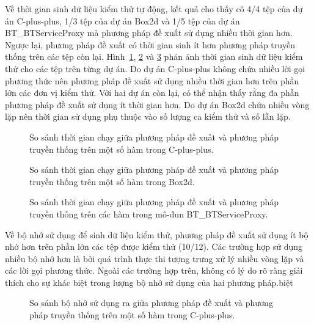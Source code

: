 Về thời gian sinh dữ liệu kiểm thử tự động, kết quả cho thấy có 4/4 tệp của dự án C-plus-plus, 1/3 tệp của dự án Box2d và 1/5 tệp của dự án BT\_BTServiceProxy mà phương pháp đề xuất sử dụng nhiều thời gian hơn. Ngược lại, phương pháp đề xuất có thời gian sinh ít hơn phương pháp truyền thống trên các tệp còn lại. Hình~\ref{fig:time-algo}, \ref{fig:time-box2d} và \ref{fig:time-serviceproxy} phản ánh thời gian sinh dữ liệu kiểm thử cho các tệp trên từng dự án. Do dự án C-plus-plus không chứa nhiều lời gọi phương thức nên phương pháp đề xuất sử dụng nhiều thời gian hơn trên phần lớn các đơn vị kiểm thử. Với hai dự án còn lại, có thể nhận thấy rằng đa phần phương pháp đề xuất sử dụng ít thời gian hơn. Do dự án Box2d chứa nhiều vòng lặp nên thời gian sử dụng phụ thuộc vào số lượng ca kiểm thử và số lần lặp.

\begin{figure}[H]
    \centering
    
    \caption{So sánh thời gian chạy giữa phương pháp đề xuất và phương pháp truyền thống trên một số hàm trong C-plus-plus.}
    \label{fig:time-algo}
\end{figure}

\begin{figure}[H]
	\centering
	
	\caption{So sánh thời gian chạy giữa phương pháp đề xuất và phương pháp truyền thống trên một số hàm trong Box2d.}
	\label{fig:time-box2d}
\end{figure}

\begin{figure}[H]
	\centering
	
	\caption{So sánh thời gian chạy giữa phương pháp đề xuất và phương pháp truyền thống trên các hàm trong mô-đun BT\_BTServiceProxy.}
	\label{fig:time-serviceproxy}
\end{figure}

Về bộ nhớ sử dụng để sinh dữ liệu kiểm thử, phương pháp đề xuất sử dụng ít bộ nhớ hơn trên phần lớn các tệp được kiểm thử (10/12). Các trường hợp sử dụng nhiều bộ nhớ hơn là bởi quá trình thực thi tượng trưng xử lý nhiều vòng lặp và các lời gọi phương thức. Ngoài các trường hợp trên, không có lý do rõ ràng giải thích cho sự khác biệt trong lượng bộ nhớ sử dụng của hai phương pháp.biệt

\begin{figure}[H]
    \centering
    
    \caption{So sánh bộ nhớ sử dụng ra giữa phương pháp đề xuất và phương pháp truyền thống trên một số hàm trong C-plus-plus.}
    \label{fig:mem-algo}
\end{figure}


